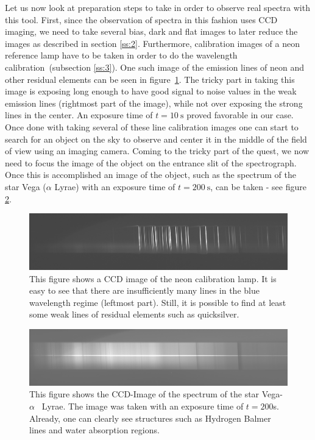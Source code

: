 \documentclass{article}
\begin{document}
Let us now look at preparation steps to take in order to observe real spectra with this tool. First, since the observation of spectra in this fashion uses CCD imaging, we need to take several bias, dark and flat images to later reduce the images as described in section \ref{ss:2}. Furthermore, calibration images of a neon reference lamp have to be taken in order to do the wavelength calibration~(subsection \ref{ss:3}). One such image of the emission lines of neon and other residual elements can be seen in figure~\ref{fig:2}. The tricky part in taking this image is exposing long enough to have good signal to noise values in the weak emission lines (rightmost part of the image), while not over exposing the strong lines in the center. An exposure time of $t=\SI{10}{\second}$ proved favorable in our case. Once done with taking several of these line calibration images one can start to search for an object on the sky to observe and center it in the middle of the field of view using an imaging camera. Coming to the tricky part of the quest, we now need to focus the image of the object on the entrance slit of the spectrograph. Once this is accomplished an image of the object, such as the spectrum of the star Vega ($\alpha$ Lyrae) with an exposure time of $t=\SI{200}{\second}$, can be taken - see figure \ref{fig:3}. 

\begin{figure}[H]
  	\centering
	\includegraphics[width=1.00\textwidth]{spectroscopy/calibration_ccd_image.jpg}
  	\caption{This figure shows a CCD image of the neon calibration lamp. It is easy to see that there are insufficiently many lines in the blue wavelength regime (leftmost part). Still, it is possible to find at least some weak lines of residual elements such as quicksilver.}
  	\label{fig:2}
\end{figure}

\begin{figure}[H]
  	\centering
    \includegraphics[width=1.00\textwidth]{spectroscopy/spectrum_ccd_image.jpg}
  	\caption{This figure shows the CCD-Image of the spectrum of the star \ldq Vega\rdq - $\alpha$ ~Lyrae. The image was taken with an exposure time of $t=200$s. Already, one can clearly see structures such as Hydrogen Balmer lines and water absorption regions.}
  	\label{fig:3}
\end{figure}
\end{document}
